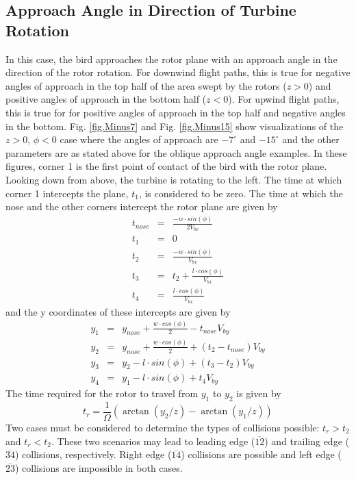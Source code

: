 \documentclass[10pt,conference]{IEEEtran}
\begin{document}
\subsection{Approach Angle in Direction of Turbine Rotation}
In this case, the bird approaches the rotor plane with an approach angle in the direction of the rotor rotation. For
downwind flight paths, this is true for negative angles of approach in the top half of the area swept by the rotors
($z>0$) and positive angles of approach in the bottom half ($z<0$). For upwind flight paths, this is true for for
positive angles of approach in the top half and negative angles in the bottom. Fig. \ref{fig.Minus7} and Fig.
\ref{fig.Minus15} show visualizations of the $z>0$, $\phi<0$ case where the angles of approach are $-7^\circ$ and
$-15^\circ$ and the other parameters are as stated above for the oblique approach angle examples. In these figures,
corner 1 is the first point of contact of the bird with the rotor plane. Looking down from above, the turbine is
rotating to the left. The time at which corner 1 intercepts the plane, $t_1$, is considered to be zero. The time at
which the nose and the other corners intercept the rotor plane are given by
\begin{eqnarray*}
    t_{nose} &=& \frac{-w \cdot sin(\phi)}{2 V_{bx}}\\
    t_1 &=& 0\\
    t_2 &=& \frac{-w \cdot sin(\phi)}{V_{bx}}\\
    t_3 &=& t_2 + \frac{l \cdot cos(\phi)}{V_{bx}}\\
    t_4 &=& \frac{l \cdot cos(\phi)}{V_{bx}}
\end{eqnarray*}
and the y coordinates of these intercepts are given by
\begin{eqnarray*}
    y_1 &=& y_{nose}+\frac{w \cdot cos(\phi)}{2}-t_{nose}V_{by}\\
    y_2 &=& y_{nose}+\frac{w \cdot cos(\phi)}{2}+(t_2-t_{nose})V_{by}\\
    y_3 &=& y_2-l \cdot sin(\phi) + (t_3-t_2)V_{by}\\
    y_4 &=& y_1-l \cdot sin(\phi) + t_4V_{by}
\end{eqnarray*}
The time required for the rotor to travel from $y_1$ to $y_2$ is given by
\begin{equation*}
    t_r = \frac{1}{\Omega}(\arctan(y_2/z)-\arctan(y_1/z))
\end{equation*}
Two cases must be considered to determine the types of collisions possible: $t_r>t_2$ and $t_r<t_2$. These two
scenarios may lead to leading edge ($\overline{12}$) and trailing edge ($\overline{34}$) collisions, respectively.
Right edge ($\overline{14}$) collisions are possible and left edge ($\overline{23}$) collisions are impossible in both
cases.
\end{document}
